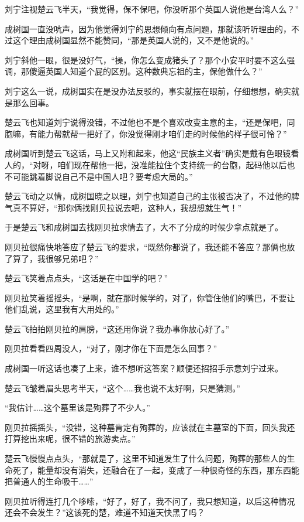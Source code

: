 刘宁注视楚云飞半天，“我觉得，保不保吧，你没听那个英国人说他是台湾人么？”

成树国一直没吭声，因为他觉得刘宁的思想倾向有点问题，那就该听听理由的，不过这个理由成树国显然不能赞同，“那是英国人说的，又不是他说的。”

刘宁斜他一眼，很是没好气，“操，你怎么变成猪头了？那个小安平时要不这么强调，那傻逼英国人知道个屁的区别。这种数典忘祖的主，保他做什么？”

刘宁这么一说，成树国实在是没办法反驳的，事实就摆在眼前，仔细想想，确实就是那么回事。

楚云飞也知道刘宁说得没错，不过他也不是个喜欢改变主意的主，“还是保吧，同胞嘛，有能力帮就帮一把好了，你没觉得刚才咱们走的时候他的样子很可怜？”

成树国听到楚云飞这话，马上又附和起来，他这“民族主义者”确实是戴有色眼镜看人的，“对呀，咱们现在帮他一把，没准能拉住个支持统一的台胞，起码他以后也不可能跳着脚说自己不是中国人吧？要考虑大局的。”

楚云飞动之以情，成树国晓之以理，刘宁也知道自己的主张被否决了，不过他的脾气真不算好，“那你俩找刚贝拉说去吧，这种人，我想想就生气！”

于是楚云飞和成树国去找刚贝拉求情去了，大不了分成的时候少拿点就是了。

刚贝拉很痛快地答应了楚云飞的要求，“既然你都说了，我还能不答应？那俩也放了算了，我很够兄弟吧？”

楚云飞笑着点点头，“这话是在中国学的吧？”

刚贝拉笑着摇摇头，“是啊，就在那时候学的，对了，你管住他们的嘴巴，不要让他们乱说，这里我有大用处的。”

楚云飞拍拍刚贝拉的肩膀，“这还用你说？我办事你放心好了。”

刚贝拉看看四周没人，“对了，刚才你在下面是怎么回事？”

成树国一听这话也凑了上来，谁不想听这答案？顺便还招招手示意刘宁过来。

楚云飞皱着眉头思考半天，“这个……我也说不太好啊，只是猜测。”

“我估计……这个墓里该是殉葬了不少人。”

刚贝拉摇摇头，“没错，这种墓肯定有殉葬的，应该就在主墓室的下面，回头我还打算挖出来呢，很不错的旅游卖点。”

楚云飞慢慢点点头，“那就是了，这里不知道发生了什么问题，殉葬的那些人的生命死了，能量却没有消失，还融合在了一起，变成了一种很奇怪的东西，那东西能把普通人的生命吸干……”

刚贝拉听得连打几个哆嗦，“好了，好了，我不问了，我只想知道，以后这种情况还会不会发生？”这该死的楚，难道不知道天快黑了吗？

